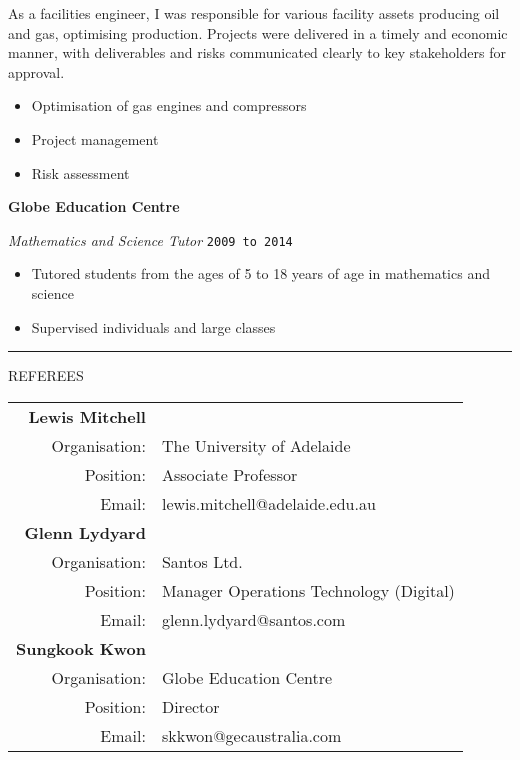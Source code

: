 \documentclass{article}
\newcommand{\HRule}{\rule{\linewidth}{0.5mm}}
\begin{document}
{\footnotesize
As a facilities engineer, I was responsible for various facility assets producing oil and gas, optimising production. Projects were delivered in a timely and economic manner, with deliverables and risks communicated clearly to key stakeholders for approval.

\begin{itemize}
\item Optimisation of gas engines and compressors
\item Project management
\item Risk assessment \\
\end{itemize} }


\textbf{Globe Education Centre}

\emph{Mathematics and Science Tutor} \hfill \texttt{2009 to 2014}
{\footnotesize
\begin{itemize}
\item Tutored students from the ages of 5 to 18 years of age in mathematics and science
\item Supervised individuals and large classes
\end{itemize} }
\HRule




{\footnotesize REFEREES}

\begin{center}



\begin{tabular}[H]{ r l}
\textbf{\large Lewis Mitchell} & \\[0.3cm]
Organisation: & The University of Adelaide \\
Position: & Associate Professor \\
Email: & lewis.mitchell@adelaide.edu.au \\[1cm]

\textbf{\large Glenn Lydyard} & \\[0.3cm]
Organisation: & Santos Ltd. \\
Position: & Manager Operations Technology (Digital)\\
Email: & glenn.lydyard@santos.com \\[1cm]

\textbf{\large Sungkook Kwon} & \\[0.3cm]
Organisation: & Globe Education Centre \\
Position: & Director \\
Email: & skkwon@gecaustralia.com \\[1cm]

\end{tabular}

\end{center}
\end{document}
